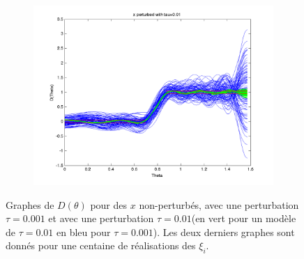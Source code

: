 \begin{figure}[h!]
\begin{subfigure}[b]{0.32\textwidth}
  \includegraphics[width=\textwidth]{D-ModRobustCon-tau001.png}
  \end{subfigure}
\caption{Graphes de $D(\theta)$ pour des $x$ non-perturbés, avec une perturbation $\tau=0.001$ et avec une perturbation $\tau = 0.01$(en vert pour un modèle de $\tau=0.01$ en bleu pour $\tau=0.001$). Les deux derniers graphes sont donnés pour une centaine de réalisations des $\xi_i$.}
  \label{fig:D-ModCon}

  \end{figure}
